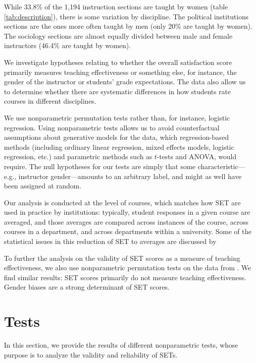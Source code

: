 \documentclass[12pt]{article}
\begin{document}
While 33.8\% of the 1,194 instruction sections are taught by women (table \ref{tab:description}), there is some variation by discipline. The political institutions sections are the ones more often taught by men (only 20\% are taught by women). The sociology sections are almost equally divided between male and female instructors (46.4\% are taught by women).  




We investigate 
hypotheses relating to whether the overall satisfaction score  primarily measures teaching
effectiveness or something else, for instance, the gender of the instructor or students'
grade expectations.
The data also allow us to determine whether there are systematic differences
in how students rate courses in different disciplines.

We use nonparametric permutation tests rather than, for instance, logistic regression.
Using nonparametric tests allows us to avoid counterfactual assumptions about
generative models for the data, which regression-based methods (including
ordinary linear regression, mixed effects models, logistic regression, etc.) and parametric
methods such as $t$-tests and ANOVA, would require.
The null hypotheses for our tests are simply that some 
characteristic---e.g., instructor gender---amounts to an arbitrary label, and might as well
have been assigned at random. 

Our analysis is conducted at the level of courses, which matches how SET are
used in practice by institutions: typically, student responses in a given course
are averaged, and those averages are compared across instances of the course,
across courses in a department, and across departments within a university.
Some of the statistical issues in this reduction of SET to averages are 
discussed by \citet{Stark2014}

To further the analysis on the validity of SET scores as a measure of teaching effectiveness, we
also use nonparametric permutation tests on the data from \citet{MacNell2014}. We find similar results: 
SET scores primarily do not measure teaching effectiveness. Gender biases are a strong determinant of SET scores.


\section{Tests}
In this section, we provide the results of different nonparametric tests, whose purpose is to analyze the validity and reliability of SETs. 
\end{document}
